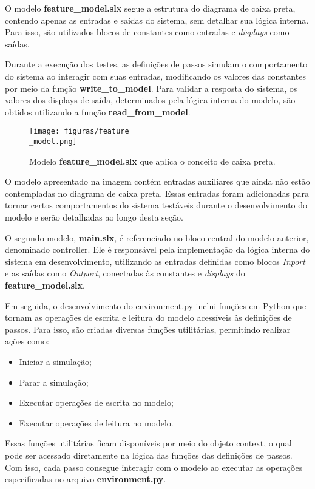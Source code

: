 O modelo \textbf{feature\_model.slx} segue a estrutura do diagrama de caixa preta, contendo apenas as entradas e saídas do sistema, sem detalhar sua lógica interna. Para 
isso, são utilizados blocos de constantes como entradas e \textit{displays} como saídas.

Durante a execução dos testes, as definições de passos simulam o comportamento do sistema ao interagir com suas entradas, modificando os valores das constantes por 
meio da função \textbf{write\_to\_model}. Para validar a resposta do sistema, os valores dos displays de saída, determinados pela lógica interna do modelo, são obtidos utilizando 
a função \textbf{read\_from\_model}.

\begin{figure}[H]
\centering
\texttt{[image: figuras/feature\\\_model.png]}
\caption{Modelo \textbf{feature\_model.slx} que aplica o conceito de caixa preta.}
\end{figure}

O modelo apresentado na imagem contém entradas auxiliares que ainda não estão contempladas no diagrama de caixa preta. Essas entradas foram adicionadas para tornar certos 
comportamentos do sistema testáveis durante o desenvolvimento do modelo e serão detalhadas ao longo desta seção.

O segundo modelo, \textbf{main.slx}, é referenciado no bloco central do modelo anterior, denominado controller. Ele é responsável pela implementação da lógica interna 
do sistema em desenvolvimento, utilizando as entradas definidas como blocos \textit{Inport} e as saídas como \textit{Outport}, conectadas às constantes e \textit{displays} 
do \textbf{feature\_model.slx}.

Em seguida, o desenvolvimento do environment.py inclui funções em Python que tornam as operações de escrita e leitura do modelo acessíveis às definições de passos. 
Para isso, são criadas diversas funções utilitárias, permitindo realizar ações como:

\begin{itemize}
	\item Iniciar a simulação;
	\item Parar a simulação;
	\item Executar operações de escrita no modelo;
	\item Executar operações de leitura no modelo.
\end{itemize}

Essas funções utilitárias ficam disponíveis por meio do objeto context, o qual pode ser acessado diretamente na lógica das funções das definições de passos. Com isso, 
cada passo consegue interagir com o modelo ao executar as operações especificadas no arquivo \textbf{environment.py}.

